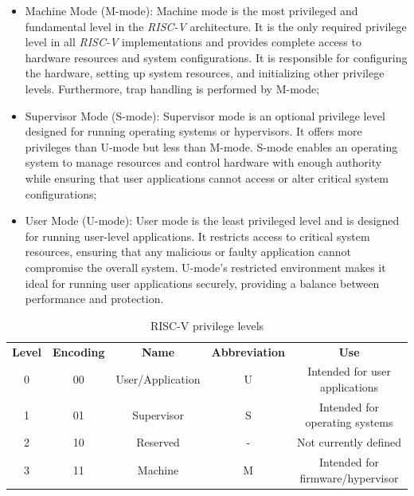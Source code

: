 \begin{itemize}
  \item Machine Mode (M-mode): Machine mode is the most privileged and
    fundamental level in the \textit{RISC-V} architecture. It is the only
    required privilege level in all \textit{RISC-V} implementations and provides
    complete access to hardware resources and system configurations. It is
    responsible for configuring the hardware, setting up system resources, and
    initializing other privilege levels. Furthermore, trap handling is performed
    by M-mode;

  \item Supervisor Mode (S-mode): Supervisor mode is an optional privilege level
    designed for running operating systems or hypervisors. It offers more privileges
    than U-mode but less than M-mode. S-mode enables an operating system to
    manage resources and control hardware with enough authority while ensuring
    that user applications cannot access or alter critical system configurations;

  \item User Mode (U-mode): User mode is the least privileged level and is
    designed for running user-level applications. It restricts access to critical
    system resources, ensuring that any malicious or faulty application cannot
    compromise the overall system. U-mode's restricted environment makes it ideal
    for running user applications securely, providing a balance between
    performance and protection.
\end{itemize}

\begin{table}
  \centering
  \begin{tabular}{|c|c|c|c|c|}
    \hline
    \textbf{Level}   & \textbf{Encoding} & \textbf{Name}    & \textbf{Abbreviation} & \textbf{Use}                     \\
    \hhline{=====} 0 & 00                & User/Application & U                     & Intended for user applications   \\
    \hline
    1                & 01                & Supervisor       & S                     & Intended for operating systems   \\
    \hline
    2                & 10                & Reserved         & -                     & Not currently defined            \\
    \hline
    3                & 11                & Machine          & M                     & Intended for firmware/hypervisor \\
    \hline
  \end{tabular}
  \caption{RISC-V privilege levels}
  \label{tab:priv}
\end{table}

